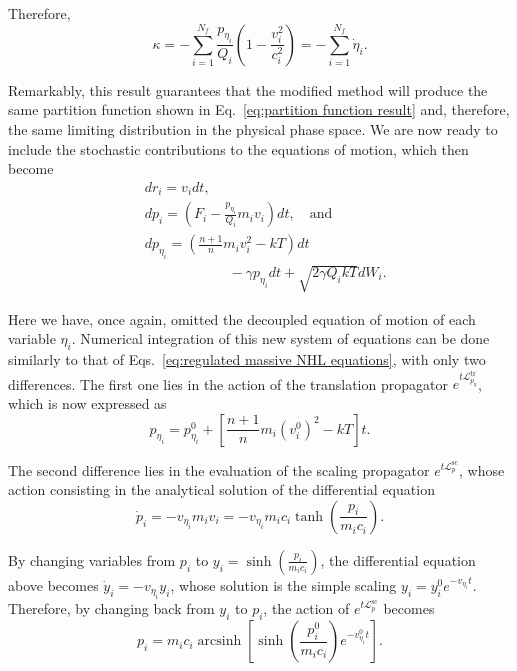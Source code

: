 \documentclass[
aip,
jcp,
reprint,
]{revtex4-1}
\DeclareMathOperator\arcsinh{arcsinh}
\newcommand{\Liu}{\mathcal{L}}
\newcommand{\nn}{n}
\begin{document}
Therefore,
\begin{equation}
\kappa = - \sum_{i=1}^{N_f} \frac{p_{\eta_i}}{Q_i} \left(1 - \frac{v_i^2}{c_i^2}\right) = -\sum_{i=1}^{N_f} \dot{\eta}_i.
\end{equation}

Remarkably, this result guarantees that the modified method will produce the same partition function shown in Eq.~\eqref{eq:partition function result} and, therefore, the same limiting distribution in the physical phase space.
We are now ready to include the stochastic contributions to the equations of motion, which then become
\begin{subequations}
	\label{eq:modified massive Nose-Hoover-Langevin equations}
	\begin{align}
	&dr_i = v_i dt, \\
	&dp_i = \left(F_i - \frac{p_{\eta_i}}{Q_i} m_i v_i\right) dt, \quad \mathrm{and} \\
	&dp_{\eta_i} = \left(\frac{\nn+1}{\nn} m_i v_i^2 - kT\right) dt \nonumber \\
	& \qquad \qquad \qquad - \gamma p_{\eta_i} dt + \sqrt{2 \gamma Q_i kT} dW_i \label{eq:modified massive Nose-Hoover-Langevin p_eta}.
	\end{align}
\end{subequations}

Here we have, once again, omitted the decoupled equation of motion of each variable $\eta_i$.
Numerical integration of this new system of equations can be done similarly to that of Eqs.~\eqref{eq:regulated massive NHL equations}, with only two differences.
The first one lies in the action of the translation propagator $e^{t \Liu^\mathrm{tr}_{p_\eta}}$, which is now expressed as
\begin{equation*}
p_{\eta_i} = p_{\eta_i}^0 + \left[\frac{\nn+1}{\nn} m_i (v_i^0)^2 - kT\right] t.
\end{equation*}

The second difference lies in the evaluation of the scaling propagator $e^{t \Liu^\mathrm{sc}_p}$, whose action consisting in the analytical solution of the differential equation
\begin{equation*}
\dot{p}_i = -v_{\eta_i} m_i v_i = -v_{\eta_i} m_i c_i \tanh\left(\frac{p_i}{m_i c_i}\right).
\end{equation*}

By changing variables from $p_i$ to $y_i = \sinh(\frac{p_i}{m_i c_i})$,
the differential equation above becomes $\dot{y}_i = -v_{\eta_i} y_i$, whose solution is the simple scaling $y_i = y_i^0 e^{-v_{\eta_i} t}$.
Therefore, by changing back from $y_i$ to $p_i$, the action of $e^{t \Liu^\mathrm{sc}_p}$ becomes
\begin{equation*}
p_i = m_i c_i \arcsinh\left[\sinh\left(\frac{p_i^0}{m_i c_i}\right)e^{-v_{\eta_i}^0 t}\right].
\end{equation*}
\end{document}
